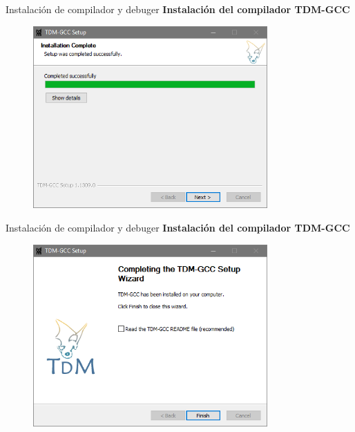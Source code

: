 \begin{frame}[fragile]{Instalación de compilador y debuger}
 \textbf{Instalación del compilador TDM-GCC}
  \begin{figure}
      \includegraphics[width=0.8\textwidth]{./resources/TDMGCC_Step_08.PNG}
  \end{figure}
\end{frame}

\begin{frame}[fragile]{Instalación de compilador y debuger}
 \textbf{Instalación del compilador TDM-GCC}
  \begin{figure}
      \includegraphics[width=0.8\textwidth]{./resources/TDMGCC_Step_09.PNG}
  \end{figure}
\end{frame}

